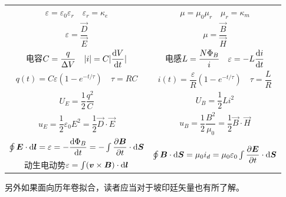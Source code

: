\begin{longtable}[c]{cc}
    $\varepsilon = \varepsilon_0\varepsilon_r\quad \varepsilon_r = \kappa_e$ & $\mu = \mu_0\mu_r\quad \mu_r = \kappa_m$\\[1.5em]
    
    $\varepsilon=\dfrac{\vec{D}}{\vec{E}}$ & $\mu=\dfrac{\vec{B}}{\vec{H}}$\\[1.5em]
    
    电容$C=\dfrac{q}{\Delta V}\quad |i|=C|\dfrac{\dif{V}}{\dif{t}}|$ & 电感$L=\dfrac{N\Phi_B}{i}\quad \varepsilon = -L\dfrac{\dif{i}}{\dif{t}}$ \\[1.5em]
    
    $q(t)=C\varepsilon(1-e^{-t/\tau})\quad \tau = RC$ & $i(t)=\dfrac{\varepsilon}{R}(1-e^{-t/\tau})\quad\tau=\dfrac{L}{R}$ \\[1.5em]
    
    $U_E=\dfrac{1}{2}\dfrac{q^2}{C}$ & $U_B=\dfrac{1}{2}Li^2$ \\[1.5em]

    $u_E=\dfrac{1}{2}\varepsilon_0 E^2 = \dfrac{1}{2}\vec{D}\cdot\vec{E}$ & $u_B=\dfrac{1}{2}\dfrac{B^2}{\mu_0} = \dfrac{1}{2}\vec{B}\cdot\vec{H}$ \\[1.5em]

    $\oint\vec{E}\cdot\dif{\vec{l}}=\varepsilon=-\dfrac{\dif{\Phi_B}}{\dif{t}}=-\int\dfrac{\partial\vec{B}}{\partial t}\cdot\dif{\vec{S}}$ & \multirow{2}{*}{$\oint\vec{B}\cdot\dif{\vec{S}}=\mu_0 i_d=\mu_0\varepsilon_0\int\dfrac{\partial\vec{E}}{\partial t}\cdot\dif{\vec{S}}$} \\[1.5em]
    动生电动势$\varepsilon=\int(\vec{v}\times\vec{B})\cdot\dif{\vec{l}}$ & \\ \hline
\end{longtable}

另外如果面向历年卷拟合，读者应当对于坡印廷矢量也有所了解。